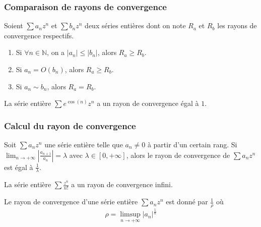   \subsubsection{Comparaison de rayons de convergence}


  Soient $\sum a_n z^n$ et $\sum b_n z^n$ deux séries entières dont on note $R_a$ et $R_b$ les rayons de convergence respectifs.

  \begin{proposition}
    \begin{enumerate}[label={\bfseries(\roman*)}]
      \item Si $\forall n \in \mathbb{N}$, on a $|a_n| \leq |b_n|$, alors $R_a \geq R_b$.
      \item Si $a_n = O(b_n)$, alors $R_a \geq R_b$.
      \item Si $a_n \sim b_n$, alors $R_a = R_b$.
    \end{enumerate}
  \end{proposition}

  \begin{example}
    La série entière $\sum e^{\cos(n)} z^n$ a un rayon de convergence égal à $1$.
  \end{example}

  \subsubsection{Calcul du rayon de convergence}


  \begin{proposition}
    Soit $\sum a_n z^n$ une série entière telle que $a_n \neq 0$ à partir d'un certain rang. Si $\lim_{n \rightarrow +\infty} \left| \frac{a_{n+1}}{a_n} \right| = \lambda$ avec $\lambda \in [0, +\infty]$, alors le rayon de convergence de $\sum a_n z^n$ est égal à $\frac{1}{\lambda}$.
  \end{proposition}

  \begin{example}
    La série entière $\sum \frac{z^n}{n!}$ a un rayon de convergence infini.
  \end{example}

  \begin{proposition}
    Le rayon de convergence d'une série entière $\sum a_n z^n$ est donné par $\frac{1}{\rho}$ où
    \[ \rho = \limsup_{n \rightarrow +\infty} |a_n|^{\frac{1}{n}} \]
  \end{proposition}

